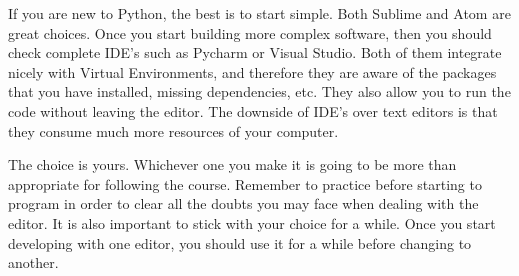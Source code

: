 If you are new to Python, the best is to start simple. Both Sublime and Atom are great choices. Once you start building more complex software, then you should check complete IDE’s such as Pycharm or Visual Studio. Both of them integrate nicely with Virtual Environments, and therefore they are aware of the packages that you have installed, missing dependencies, etc. They also allow you to run the code without leaving the editor. The downside of IDE’s over text editors is that they consume much more resources of your computer.

The choice is yours. Whichever one you make it is going to be more than appropriate for following the course. Remember to practice before starting to program in order to clear all the doubts you may face when dealing with the editor. It is also important to stick with your choice for a while. Once you start developing with one editor, you should use it for a while before changing to another.
